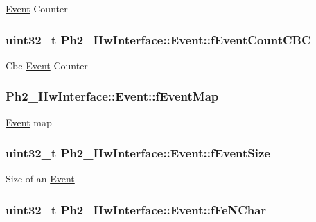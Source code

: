 \hyperlink{class_ph2___hw_interface_1_1_event}{Event} Counter \hypertarget{class_ph2___hw_interface_1_1_event_ac61b0e2c53e5d4228d43132f470dfdac}{
\subsubsection[{f\-Event\-Count\-C\-B\-C}]{\setlength{\rightskip}{0pt plus 5cm}uint32\-\_\-t Ph2\-\_\-\-Hw\-Interface\-::\-Event\-::f\-Event\-Count\-C\-B\-C\hspace{0.3cm}{\ttfamily [private]}}}\label{class_ph2___hw_interface_1_1_event_ac61b0e2c53e5d4228d43132f470dfdac}
Cbc \hyperlink{class_ph2___hw_interface_1_1_event}{Event} Counter \hypertarget{class_ph2___hw_interface_1_1_event_ace9844f1fc14895f880ed111c705d392}{
\subsubsection[{f\-Event\-Map}]{ Ph2\-\_\-\-Hw\-Interface\-::\-Event\-::f\-Event\-Map\hspace{0.3cm}{\ttfamily [private]}}}\label{class_ph2___hw_interface_1_1_event_ace9844f1fc14895f880ed111c705d392}
\hyperlink{class_ph2___hw_interface_1_1_event}{Event} map \hypertarget{class_ph2___hw_interface_1_1_event_a0a12db10e67652851517cc65c8057667}{
\subsubsection[{f\-Event\-Size}]{\setlength{\rightskip}{0pt plus 5cm}uint32\-\_\-t Ph2\-\_\-\-Hw\-Interface\-::\-Event\-::f\-Event\-Size}}\label{class_ph2___hw_interface_1_1_event_a0a12db10e67652851517cc65c8057667}
Size of an \hyperlink{class_ph2___hw_interface_1_1_event}{Event} \hypertarget{class_ph2___hw_interface_1_1_event_a4d5cdd6c250eecb7bfd2f0ee3b1056a4}{
\subsubsection[{f\-Fe\-N\-Char}]{\setlength{\rightskip}{0pt plus 5cm}uint32\-\_\-t Ph2\-\_\-\-Hw\-Interface\-::\-Event\-::f\-Fe\-N\-Char}}\label{class_ph2___hw_interface_1_1_event_a4d5cdd6c250eecb7bfd2f0ee3b1056a4}
